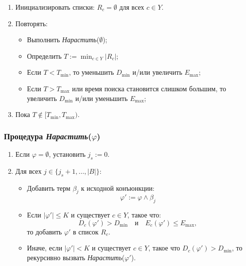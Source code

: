 \begin{enumerate}
    \item Инициализировать списки: \(R_c = \emptyset\) для всех \(c \in Y\).
    \item Повторять:
          \begin{itemize}
              \item Выполнить \textit{Нарастить}(\(\emptyset\));
              \item Определить \(T := \min_{c \in Y} |R_c|\);
              \item Если \(T < T_{\text{min}}\), то уменьшить \(D_{\text{min}}\) и/или увеличить \(E_{\text{max}}\);
              \item Если \(T > T_{\text{max}}\) или время поиска становится слишком большим, то увеличить \(D_{\text{min}}\) и/или уменьшить \(E_{\text{max}}\);
          \end{itemize}
    \item Пока \(T \notin [T_{\text{min}}, T_{\text{max}})\).
\end{enumerate}

\subsubsection{Процедура \textit{Нарастить}(\(\varphi\))}

\begin{enumerate}
    \item Если \(\varphi = \emptyset\), установить \(j_s := 0\).
    \item Для всех \(j \in \{ j_s + 1, \dots, |B| \}\):
          \begin{itemize}
              \item Добавить терм \(\beta_j\) к исходной конъюнкции:
                    \[
                        \varphi' := \varphi \wedge \beta_j
                    \]
              \item Если \(|\varphi'| \leq K\) и существует \(c \in Y\), такое что:
                    \[
                        D_c(\varphi') > D_{\text{min}} \quad \text{и} \quad E_c(\varphi') \leq E_{\text{max}},
                    \]
                    то добавить \(\varphi'\) в список \(R_c\).
              \item Иначе, если \(|\varphi'| < K\) и существует \(c \in Y\), такое что \(D_c(\varphi') > D_{\text{min}}\), то рекурсивно вызвать \textit{Нарастить}(\(\varphi'\)).
          \end{itemize}
\end{enumerate}

